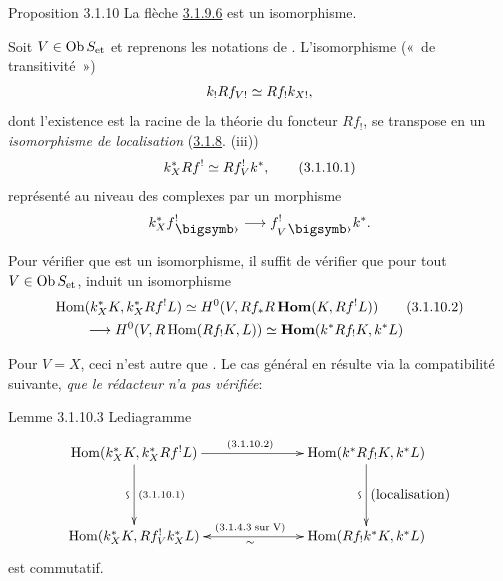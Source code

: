 \documentclass[10pt]{../fichiers-configuration-latex/smfart}
\begin{document}
\begin{enonce*}{Proposition 3.1.10}
La flèche \hyperref[XVIII.eq3.1.9.6]{3.1.9.6} est un isomorphisme.
\end{enonce*}

Soit $V\in \operatorname{Ob} S_{\text{\rm et}}$ et reprenons les notations de
. L'isomorphisme (« de transitivité »)
$$
k_{!}Rf_{V!}\simeq Rf_{!}k_{X!}{},
$$
dont l'existence est la racine de la théorie du foncteur $Rf_{!}$, se
transpose en un \emph{isomorphisme de localisation} (\hyperref[XVIII.prop3.1.8]{3.1.8}. (iii))
\begin{equation*}
k^{\ast}_{X}Rf^{!}\simeq Rf^{!}_{V}k^{\ast}{},\tag{3.1.10.1}
\end{equation*}%
représenté au niveau des complexes par un morphisme
$$
k^{\ast}_{X}f^{!}_{\bigdot}\longrightarrow f^{!}_{V\bigdot}k^{\ast}{\quoi}.
$$

Pour vérifier que  est un isomorphisme, il suffit de vérifier
que pour tout $V\in \operatorname{Ob} S_{\text{\rm et}}$,  induit un
isomorphisme 
\begin{align*}
\operatorname{Hom} &(k^{\ast}_{X}K,k^{\ast}_{X}Rf^{!}L)\simeq
 H^{0}(V,Rf_{\ast}R\operatorname{\mathbf{Hom}} (K,Rf^{!}L))\tag{3.1.10.2}\\
& \longrightarrow H^{0}(V,R\operatorname{Hom}(Rf_{!}K,L))\simeq
 \operatorname{\mathbf{Hom}}(k^{\ast}Rf_{!}K,k^{\ast}L)
\end{align*}

Pour $V=X$, ceci n'est autre que . Le cas général en résulte
via la compatibilité suivante, \emph{que le rédacteur n'a pas vérifiée}:

\begin{enonce*}{Lemme 3.1.10.3}
Le\pageoriginale diagramme
$$
\xymatrix@C=2.5cm@R=1.5cm{
\Hom(k^{\ast}_XK, k^{\ast}_XRf^{!}L)
\ar[r]^{\scriptstyle{(3.1.10.2)}} \ar[d]^{\scriptstyle{(3.1.10.1)}}_{\text{\rotatebox{90}{$\backsim$}}}&
\Hom(k^{\ast}Rf_!K,k^{\ast}L) \ar[d]^{\txt{\rm (localisation)}}_{\text{\rotatebox{90}{$\backsim$}}}\\
\Hom(k^{\ast}_XK, Rf^{!}_Vk^{\ast}_XL)
\ar@{<->}[r]^{\scriptstyle{\rm{(3.1.4.3\; sur\; V)}}}_{\sim}& \Hom(Rf_!k^{\ast}K,k^{\ast}L)
}
$$
est commutatif.
\end{enonce*}

\setcounter{subsubsection}{10}
\end{document}
